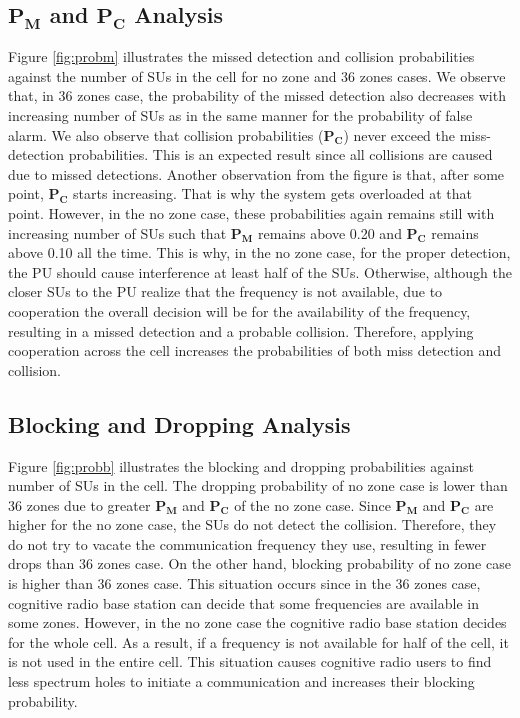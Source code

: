 \documentclass[conference,compsoc]{IEEEtran}
\newcommand{\probm}{\mathbf{P_M}}
\newcommand{\CR}{cognitive radio }
\begin{document}
\subsection{$\probm$ and $\mathbf{P_C}$ Analysis}
Figure \ref{fig:probm} illustrates the missed detection and collision probabilities against the number of SUs in the cell for no zone and 36 zones cases. We observe that, in 36 zones case, the probability of the missed detection also decreases with increasing number of SUs as in the same manner for the probability of false alarm. We also observe that collision probabilities ($\mathbf{P_C}$) never exceed the miss-detection probabilities. This is an expected result since all collisions are caused due to missed detections. Another observation from the figure is that, after some point, $\mathbf{P_C}$ starts increasing. That is why the system gets overloaded at that point. However, in the no zone case, these probabilities again remains still with increasing number of SUs such that $\probm$ remains above 0.20 and $\mathbf{P_C}$ remains above 0.10 all the time. This is why, in the no zone case, for the proper detection, the PU should cause interference at least half of the SUs. Otherwise, although the closer SUs to the PU realize that the frequency is not available, due to cooperation the overall decision will be for the availability of the frequency, resulting in a missed detection and a probable collision. Therefore, applying cooperation across the cell increases the probabilities of both miss detection and collision.

\subsection{Blocking and Dropping Analysis}
Figure \ref{fig:probb} illustrates the blocking and dropping probabilities against number of SUs in the cell. The dropping probability of no zone case is lower than 36 zones due to greater $\probm$ and $\mathbf{P_C}$ of the no zone case. Since $\probm$ and $\mathbf{P_C}$ are higher for the no zone case, the SUs do not detect the collision. Therefore, they do not try to vacate the communication frequency they use, resulting in fewer drops than 36 zones case. On the other hand, blocking probability of no zone case is higher than 36 zones case. This situation occurs since in the 36 zones case, \CR base station can decide that some frequencies are available in some zones. However, in the no zone case the \CR base station decides for the whole cell. As a result, if a frequency is not available for half of the cell, it is  not used in the entire cell. This situation causes \CR users to find less spectrum holes to initiate a communication and increases their blocking probability.
\end{document}
